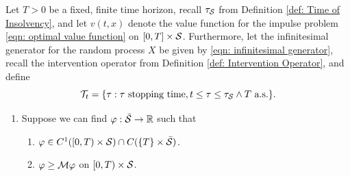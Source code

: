 \begin{theorem}
\label{trm: Verification for Impulse Control}
Let $T > 0$ be a fixed, finite time horizon, recall $\tau_{\mathcal{S}}$ from Definition \ref{def: Time of Insolvency}, and let $v(t,x)$ denote the value function for the impulse problem \eqref{eqn: optimal value function} on $[0,T] \times \mathcal{S}$. Furthermore, let the infinitesimal generator for the random process $X$ be given by \eqref{eqn: infinitesimal generator}, recall the intervention operator from Definition \ref{def: Intervention Operator}, and define 
\begin{equation*}
    \mathcal{T}_t = \{ \tau: \tau \text{ stopping time}, t \leq \tau \leq \tau_{\mathcal{S}} \wedge T \text{ a.s.}\}.
\end{equation*}
    \begin{enumerate}[label=(\alph*)]
        \item Suppose we can find $\varphi: \Bar{\mathcal{S}} \rightarrow \mathbb{R}$ such that
        \begin{enumerate}[label=(\roman*)]
            \item $\varphi \in C^1([0,T) \times \mathcal{S}) \cap C(\{T\} \times \Bar{\mathcal{S}})$.
            \item $\varphi \geq \mathcal{M} \varphi$ on $[0,T) \times \mathcal{S}$. 
        \end{enumerate}
        

\end{enumerate}
\end{theorem}
